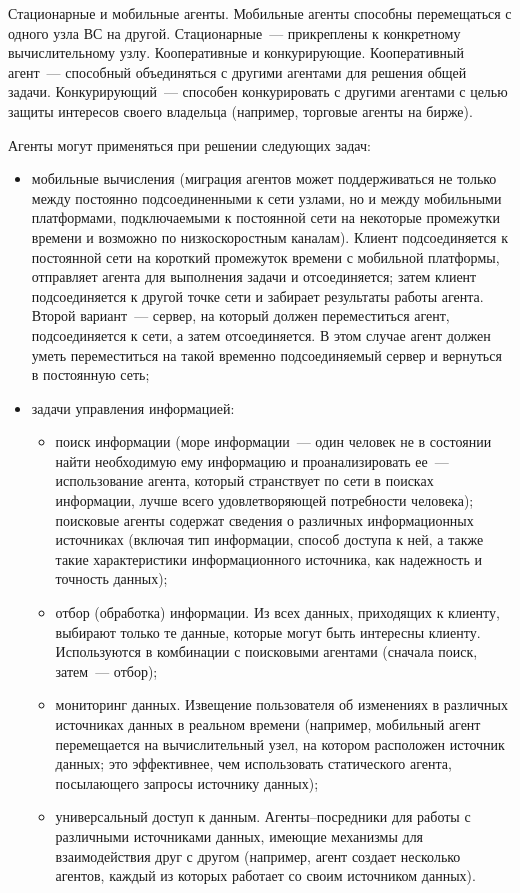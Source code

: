 Стационарные и мобильные агенты. Мобильные агенты способны перемещаться с одного узла ВС на другой. Стационарные~--- прикреплены к конкретному вычислительному узлу.
Кооперативные и конкурирующие. Кооперативный агент~--- способный объединяться с другими агентами для решения общей задачи. Конкурирующий~--- способен конкурировать с другими агентами с целью защиты интересов своего владельца (например, торговые агенты на бирже).

Агенты могут применяться при решении следующих задач:
\begin{itemize}
\item мобильные вычисления (миграция агентов может поддерживаться не только между постоянно подсоединенными к сети узлами, но и между мобильными платформами, подключаемыми к постоянной сети на некоторые промежутки времени и возможно по низкоскоростным каналам). Клиент подсоединяется к постоянной сети на короткий промежуток времени с мобильной платформы, отправляет агента для выполнения задачи и отсоединяется; затем клиент подсоединяется к другой точке сети и забирает результаты работы агента. Второй вариант~--- сервер, на который должен переместиться агент, подсоединяется к сети, а затем отсоединяется. В этом случае агент должен уметь переместиться на такой временно подсоединяемый сервер и вернуться в постоянную сеть;
\item задачи управления информацией:
\begin{itemize}
\item поиск информации (море информации~--- один человек не в состоянии найти необходимую ему информацию и проанализировать ее~--- использование агента, который странствует по сети в поисках информации, лучше всего удовлетворяющей потребности человека); поисковые агенты содержат сведения о различных информационных источниках (включая тип информации, способ доступа к ней, а также такие характеристики информационного источника, как надежность и точность данных);
\item отбор (обработка) информации. Из всех данных, приходящих к клиенту, выбирают только те данные, которые могут быть интересны клиенту. Используются в комбинации с поисковыми агентами (сначала поиск, затем~--- отбор);
\item мониторинг данных. Извещение пользователя об изменениях в различных источниках данных в реальном времени (например, мобильный агент перемещается на вычислительный узел, на котором расположен источник данных; это эффективнее, чем использовать статического агента, посылающего запросы источнику данных);
\item универсальный доступ к данным. Агенты–посредники для работы с различными источниками данных, имеющие механизмы для взаимодействия друг с другом (например, агент создает несколько агентов, каждый из которых работает со своим источником данных).
\end{itemize}
\end{itemize}

